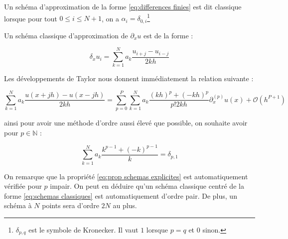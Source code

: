 \begin{definition}
Un schéma d'approximation de la forme \eqref{eq:differences finies}
est dit classique lorsque pour tout $0 \leq i \leq N+1$, on a
$\alpha_i = \delta_{0,i}$\footnote{$\delta_{p,q}$ est le symbole de
  Kronecker. Il vaut $1$ lorsque $p=q$ et $0$ sinon.}
\end{definition}

Un schéma classique d'approximation de $\partial_x u$ est de la forme
:

\begin{equation}
  \label{eq:schemas classiques}
 \delta_x u_i = \sum_{k=1}^N a_k \dfrac{u_{i+j} - u_{i-j}}{2kh}
\end{equation}

Les développements de Taylor nous donnent immédiatement la relation
suivante :

\begin{equation}
\label{eq:taylor}
 \sum_{k=1}^N a_k \dfrac{u(x+jh) - u(x-jh)}{2kh} = \sum_{p=0}^{P}
 \sum_{k=1}^N a_k \dfrac{(kh)^p + (-kh)^p}{p! 2 k h} \partial_x^{(p)} u(x)
 + \mathcal{O} \left( h^{P+1} \right)
\end{equation}

ainsi pour avoir une méthode d'ordre aussi élevé que possible, on souhaite avoir pour $p \in \mathbb{N}$ :

\begin{equation}
  \label{eq:prop schemas explicites}
\sum_{k=1}^N a_k \dfrac{k^{p-1} + (-k)^{p-1}}{k} = \delta_{p,1}
\end{equation}

On remarque que la propriété \eqref{eq:prop schemas explicites} est automatiquement vérifiée pour $p$ impair. On peut en déduire qu'un schéma classique centré de la forme \eqref{eq:schemas classiques} est automatiquement d'ordre pair. De plus, un schéma à $N$ points sera d'ordre $2N$ au plus. 

